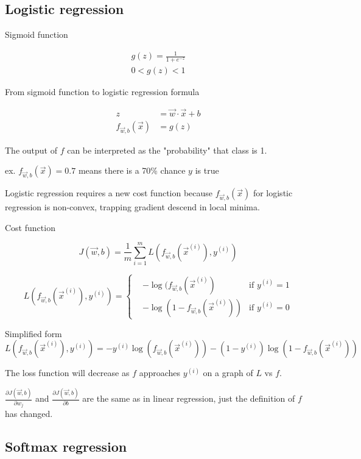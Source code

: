 \documentclass[12pt]{article}
\begin{document}
\subsection{Logistic regression}

Sigmoid function

\begin{gather*}
g(z) = \frac{1}{1 + e^{-z}}\\
0 < g(z) < 1
\end{gather*}

From sigmoid function to logistic regression formula

\begin{align*}
z &= \vec{w} \cdot \vec{x} + b\\
f_{\vec{w},b}(\vec{x}) &= g(z)
\end{align*}

The output of $f$ can be interpreted as the "probability" that class is 1.

ex. $f_{\vec{w},b}(\vec{x}) = 0.7$ means there is a 70\% chance $y$ is true

Logistic regression requires a new cost function because $f_{\vec{w},b}(\vec{x})$ for logistic regression is non-convex, trapping gradient descend in local minima.

Cost function

\[ J(\vec{w},b) = \frac{1}{m} \sum_{i=1}^{m} L(f_{\vec{w},b}(\vec{x}^{(i)}),y^{(i)}) \]

\begin{equation*}
L(f_{\vec{w},b}(\vec{x}^{(i)}),y^{(i)}) = 
  \left\{
    \begin{aligned}
      & -\log(f_{\vec{w},b}(\vec{x}^{(i)}) & \text{if } y^{(i)} = 1 \\
      & -\log(1 - f_{\vec{w},b}(\vec{x}^{(i)})) & \text{if } y^{(i)} = 0
    \end{aligned}
  \right.
\end{equation*}

Simplified form
\[ L(f_{\vec{w},b}(\vec{x}^{(i)}), y^{(i)}) = -y^{(i)} \log(f_{\vec{w},b}(\vec{x}^{(i)})) - (1 - y^{(i)}) \log (1 - f_{\vec{w},b}(\vec{x}^{(i)})) \]

The loss function will decrease as $f$ approaches $y^{(i)}$ on a graph of $L$ vs $f$.

$\frac{\partial J(\vec{w},b)}{\partial w_j}$ and $\frac{\partial J(\vec{w},b)}{\partial b}$ are the same as in linear regression, just the definition of $f$ has changed.

\subsection{Softmax regression}
\end{document}
